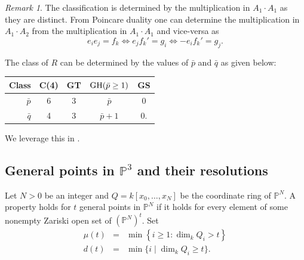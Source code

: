 \documentclass[reqno]{amsart}
\newcommand{\GH}{{\rm GH}}
\theoremstyle{plain} %
\theoremstyle{definition}
\theoremstyle{remark}
\newtheorem{remark}[theorem]{Remark}
\begin{document}
 \begin{remark}\label{Mult_duality}
      The classification is determined by the multiplication in $A_1\cdot A_1$ as they are distinct. From Poincare duality one can determine the multiplication in $A_1\cdot A_2$ from the multiplication in $A_1\cdot A_1$ and vice-versa  as  $$e_ie_j=f_k\iff e_jf_k'=g_i \iff -e_if_k'=g_j.$$ 
 \end{remark}

 The class of $R$ can be determined by the values of $\bar p$ and $\bar q$ as given below:
\begin{center}

\begin{tabular}{r|c c c c}
    Class &  C(4) &GT& $\overset{}{\GH(\bar p\geq 1)} $ &GS  \\ \hline
    $\bar p$ & 6&  3& $\bar p$& 0\\ 
    $\bar q$ & 4&3 &$\bar p+1$&0.\\
     
\end{tabular}
\end{center}
We leverage this in .






\subsection{General points in $\mathbb{P}^3$ and their resolutions}



Let  $N>0$ be an integer and $Q=k[x_0,\ldots, x_N]$ be the coordinate ring of $\mathbb{P}^N$. A property holds for $t$ general points in $\mathbb{P}^N$ if it holds for every element of some nonempty Zariski open set of $(\mathbb{P}^N)^t$. Set 
\begin{eqnarray}
\mu(t) &=&\min\left\{i\ge1:\dim_k Q_i>t\right\} \label{eq: mu}\\
  d(t)&=&\min\{i\mid \dim_k Q_i\geq t\}. \label{eq: dt} 
\end{eqnarray}  
\end{document}
